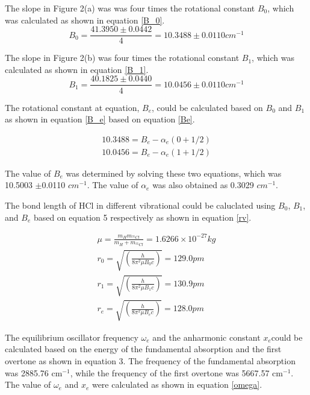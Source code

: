 \documentclass[twocolumn]{article} %
\begin{document}
The slope in Figure 2(a) was was four times the rotational constant $B_0$, which was calculated as shown in equation \ref{B_0}.
\begin{equation}
    B_0 = \frac{41.3950 \pm 0.0442}{4} = 10.3488 \pm 0.0110 cm^{-1}
    \label{B_0}
\end{equation}

The slope in Figure 2(b) was four times the rotational constant $B_1$, which was calculated as shown in equation \ref{B_1}.
\begin{equation}
    B_1 = \frac{40.1825 \pm 0.0440}{4} = 10.0456 \pm 0.0110 cm^{-1}
    \label{B_1}
\end{equation}

The rotational constant at equation, $B_e$, could be calculated based on $B_0$ and $B_1$ as shown in equation \ref{B_e} based on equation \ref{Be}.

\begin{subequations}
    \label{B_e}
    \begin{align}
        10.3488 = B_e - \alpha_e (0+1/2)\\
        10.0456 = B_e - \alpha_e (1+1/2)
    \end{align}
\end{subequations}

The value of $B_e$ was determined by solving these two equations, which was 10.5003 $\pm$0.0110 $cm^{-1}$. The value of $\alpha_e$ was also obtained as 0.3029 $cm^{-1}$.

The bond length of HCl in different vibrational could be caluclated using $B_0$, $B_1$, and $B_e$ based on equation 5 respectively as shown in equation \ref{rv}. 


\begin{subequations}
    \label{rv}
    \begin{gather}
        \mu = \frac{m_H m_{^{35}Cl}}{m_{H}+m_{^{35}Cl}} = 1.6266 \times 10^{-27} kg\\
        r_0 = \sqrt{(\frac{h}{8\pi^2\mu B_0 c})} = 129.0 pm\\
        r_1 = \sqrt{(\frac{h}{8\pi^2\mu B_1 c})} = 130.9 pm\\
        r_e = \sqrt{(\frac{h}{8\pi^2\mu B_e c})} = 128.0 pm 
    \end{gather}
\end{subequations}


The equilibrium oscillator frequency $\omega_e$ and the anharmonic constant $x_e$could be calculated based on the energy of the fundamental absorption and the first overtone as shown in equation 3. The frequency of the fundamental absorption was 2885.76 cm$^{-1}$, while the frequency of the first overtone was 5667.57 cm$^{-1}$. The value of $\omega_e$ and $x_e$ were calculated as shown in equation \ref{omega}.
\end{document}

